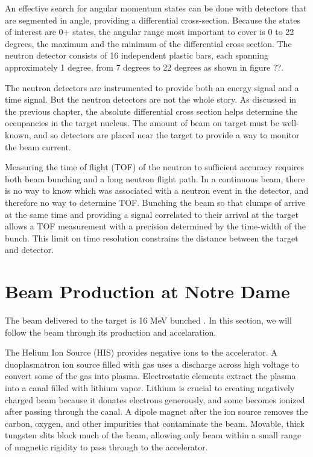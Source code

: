 An effective search for angular momentum states can be done with detectors that are segmented in angle, providing a differential cross-section.  Because the states of interest are 0+ states, the angular range most important to cover is 0 to 22 degrees, the maximum and the minimum of the differential cross section.  The neutron detector consists of 16 independent plastic bars, each spanning approximately 1 degree, from 7 degrees to 22 degrees as shown in figure ??.


The neutron detectors are instrumented to provide both an energy signal and a time signal.  But the neutron detectors are not the whole story.  As discussed in the previous chapter, the absolute differential cross section helps determine the occupancies in the target nucleus.  The amount of beam on target must be well-known, and so detectors are placed near the target to provide a way to monitor the beam current.

Measuring the time of flight (TOF) of the neutron to sufficient accuracy requires both beam bunching and a long neutron flight path.  In a continuous beam, there is no way to know which  was associated with a neutron event in the detector, and therefore no way to determine TOF.  Bunching the beam so that clumps of  arrive at the same time and providing a signal correlated to their arrival at the target allows a TOF measurement with a precision determined by the time-width of the bunch.  This limit on time resolution constrains the distance between the target and detector.  

\section{Beam Production at Notre Dame}
The beam delivered to the target is 16 MeV bunched .  In this section, we will follow the beam through its production and accelaration.

The Helium Ion Source (HIS) provides negative  ions to the accelerator.  A duoplasmatron ion source filled with  gas uses a discharge across high voltage to convert some of the gas into plasma.  Electrostatic elements extract the plasma into a canal filled with lithium vapor.  Lithium is crucial to creating negatively charged beam because it donates electrons generously, and some  becomes ionized after passing through the canal.  A dipole magnet after the ion source removes the carbon, oxygen, and other impurities that contaminate the  beam.  Movable, thick tungsten slits block much of the beam, allowing only beam within a small range of magnetic rigidity to pass through to the accelerator.

